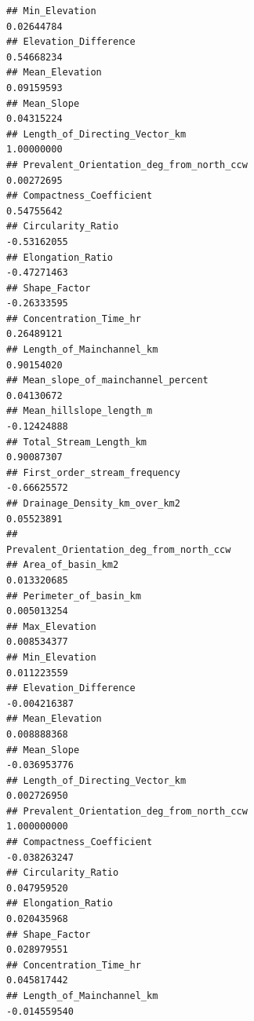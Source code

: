 \documentclass[11pt,]{article}
\begin{document}
\begin{verbatim}
## Min_Elevation                                               0.02644784
## Elevation_Difference                                        0.54668234
## Mean_Elevation                                              0.09159593
## Mean_Slope                                                  0.04315224
## Length_of_Directing_Vector_km                               1.00000000
## Prevalent_Orientation_deg_from_north_ccw                    0.00272695
## Compactness_Coefficient                                     0.54755642
## Circularity_Ratio                                          -0.53162055
## Elongation_Ratio                                           -0.47271463
## Shape_Factor                                               -0.26333595
## Concentration_Time_hr                                       0.26489121
## Length_of_Mainchannel_km                                    0.90154020
## Mean_slope_of_mainchannel_percent                           0.04130672
## Mean_hillslope_length_m                                    -0.12424888
## Total_Stream_Length_km                                      0.90087307
## First_order_stream_frequency                               -0.66625572
## Drainage_Density_km_over_km2                                0.05523891
##                                          Prevalent_Orientation_deg_from_north_ccw
## Area_of_basin_km2                                                     0.013320685
## Perimeter_of_basin_km                                                 0.005013254
## Max_Elevation                                                         0.008534377
## Min_Elevation                                                         0.011223559
## Elevation_Difference                                                 -0.004216387
## Mean_Elevation                                                        0.008888368
## Mean_Slope                                                           -0.036953776
## Length_of_Directing_Vector_km                                         0.002726950
## Prevalent_Orientation_deg_from_north_ccw                              1.000000000
## Compactness_Coefficient                                              -0.038263247
## Circularity_Ratio                                                     0.047959520
## Elongation_Ratio                                                      0.020435968
## Shape_Factor                                                          0.028979551
## Concentration_Time_hr                                                 0.045817442
## Length_of_Mainchannel_km                                             -0.014559540

\end{verbatim}
\end{document}
